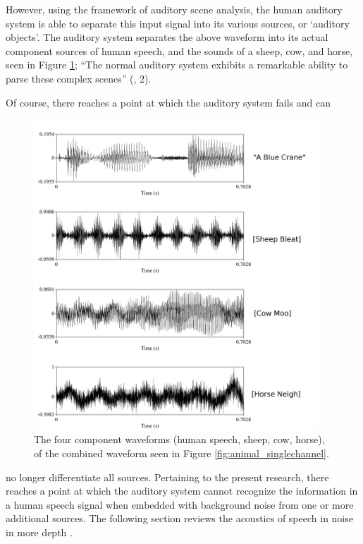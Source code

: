 However, using the framework of auditory scene analysis, the human auditory system is able to separate this input signal into its various sources, or `auditory objects'.  The auditory system separates the above waveform into its actual component sources of human speech, and the sounds of a sheep, cow, and horse, seen in Figure \ref{fig:animal_multichannel}; ``The normal auditory system exhibits a remarkable ability to parse these complex scenes'' (\cite{middlebrooks:17}, 2).

Of course, there reaches a point at which the auditory system fails and can
%
\begin{figure}[h!]
\centering
  \includegraphics[width=0.95\textwidth]{figure/animal_multichannel-w-text.png}
  \caption{The four component waveforms (human speech, sheep, cow, horse), of the combined waveform seen in Figure \ref{fig:animal_singlechannel}.}
  \label{fig:animal_multichannel}
\end{figure}
%
 no longer differentiate all sources. Pertaining to the present research, there reaches a point at which the auditory system cannot recognize the information in a human speech signal when embedded with background noise from one or more additional sources.  The following section reviews the acoustics of speech in noise in more depth .

